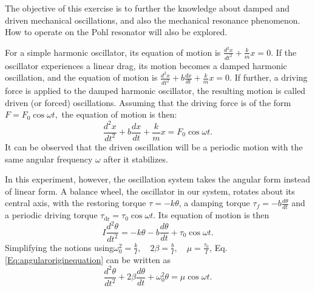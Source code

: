 \documentclass[a4paper]{article}
\begin{document}
The objective of this exercise is to further the knowledge about damped and driven mechanical oscillations, and also the mechanical resonance phenomenon. How to operate on the Pohl resonator will also be explored.

For a simple harmonic oscillator, its equation of motion is $\displaystyle\frac{d^{2} x}{d t^{2}}+ \frac{k}{m}x = 0.$ If the oscillator experiences a linear drag, its motion becomes a damped harmonic oscillation, and the equation of motion is $\displaystyle\frac{d^{2} x}{d t^{2}}+ b \frac{d x}{d t} + \frac{k}{m}x = 0.$ If further, a driving force is applied to the damped harmonic oscillator, the resulting motion is called driven (or forced) oscillations. Assuming that the driving force is of the form $\displaystyle F=F_{0} \cos \omega t,$ the equation of motion is then:
\begin{equation}\label{Eq:linearequation}
\frac{d^{2} x}{d t^{2}}+ b \frac{d x}{d t} + \frac{k}{m}x = F_{0} \cos \omega t.
\end{equation}
It can be observed that the driven oscillation will be a periodic motion with the same angular frequency $\omega$ after it stabilizes.

In this experiment, however, the oscillation system takes the angular form instead of linear form. A balance wheel, the oscillator in our system, rotates about its central axis, with the restoring torque $\displaystyle\tau=-k \theta$, a damping torque $\displaystyle\tau_{f}=-b \frac{d \theta}{d t}$ and a periodic driving torque $\displaystyle\tau_{\mathrm{dr}}=\tau_{0} \cos \omega t$. Its equation of motion is then
\begin{equation}\label{Eq:angularoriginequation}
I \frac{d^{2} \theta}{d t^{2}}=-k \theta-b \frac{d \theta}{d t}+\tau_{0} \cos \omega t.
\end{equation}
Simplifying the notions using$\displaystyle\omega_{0}^{2}=\frac{k}{I}, \quad 2 \beta=\frac{b}{I}, \quad \mu=\frac{\tau_{0}}{I}$, Eq.\ref{Eq:angularoriginequation} can be written as
\begin{equation}\label{Eq:angularequation}
\frac{d^{2} \theta}{d t^{2}}+2 \beta \frac{d \theta}{d t}+\omega_{0}^{2} \theta=\mu \cos \omega t.
\end{equation}
\end{document}
